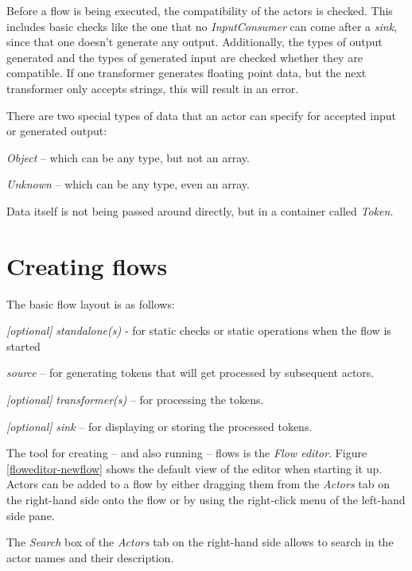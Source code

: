 Before a flow is being executed, the compatibility of the actors is
checked. This includes basic checks like the one that no \textit{InputConsumer}
can come after a \textit{sink}, since that one doesn't generate any output.
Additionally, the types of output generated and the types of generated input are
checked whether they are compatible. If one transformer generates floating
point data, but the next transformer only accepts strings, this will result in
an error.

There are two special types of data that an actor can specify for accepted input
or generated output:
\begin{tight_itemize}
  \item \textit{Object} -- which can be any type, but not an array.
  \item \textit{Unknown} -- which can be any type, even an array.
\end{tight_itemize}

\noindent Data itself is not being passed around directly, but in a container
called \textit{Token}.

\newpage
\section{Creating flows}
The basic flow layout is as follows:
\begin{tight_itemize}
  \item \textit{[optional]} \textit{standalone(s)} - for static checks or static
  operations when the flow is started
  \item \textit{source} -- for generating tokens that will get processed by
  subsequent actors.
  \item \textit{[optional]} \textit{transformer(s)} -- for processing the
  tokens.
  \item \textit{[optional]} \textit{sink} -- for displaying or storing the
  processed tokens.
\end{tight_itemize}
The tool for creating -- and also running -- flows is the \textit{Flow editor}.
Figure \ref{floweditor-newflow} shows the default view of the editor when
starting it up. Actors can be added to a flow by either dragging them from the
\textit{Actors} tab on the right-hand side onto the flow or by using the
right-click menu of the left-hand side pane.

The \textit{Search} box of the \textit{Actors} tab on the right-hand side allows
to search in the actor names and their description.

